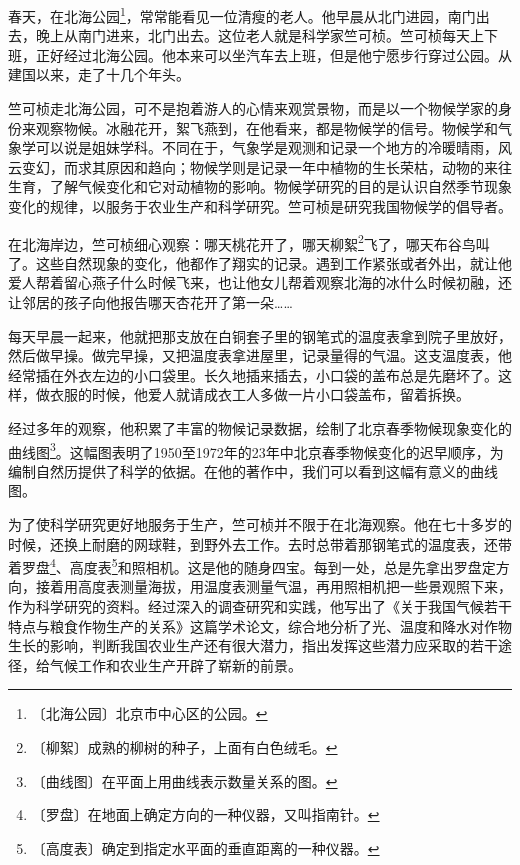 \documentclass[12pt,UTF-8,openany]{ctexbook}
\begin{document}
\begin{Large}
    
    春天，在北海公园\footnote{〔北海公园〕北京市中心区的公园。}，常常能看见一位清瘦的老人。他早晨从北门进园，南门出去，晚上从南门进来，北门出去。这位老人就是科学家竺可桢。竺可桢每天上下班，正好经过北海公园。他本来可以坐汽车去上班，但是他宁愿步行穿过公园。从建国以来，走了十几个年头。
    
    竺可桢走北海公园，可不是抱着游人的心情来观赏景物，而是以一个物候学家的身份来观察物候。冰融花开，絮飞燕到，在他看来，都是物候学的信号。物候学和气象学可以说是姐妹学科。不同在于，气象学是观测和记录一个地方的冷暖晴雨，风云变幻，而求其原因和趋向；物候学则是记录一年中植物的生长荣枯，动物的来往生育，了解气候变化和它对动植物的影响。物候学研究的目的是认识自然季节现象变化的规律，以服务于农业生产和科学研究。竺可桢是研究我国物候学的倡导者。
    
    在北海岸边，竺可桢细心观察：哪天桃花开了，哪天柳絮\footnote{〔柳絮〕成熟的柳树的种子，上面有白色绒毛。}飞了，哪天布谷鸟叫了。这些自然现象的变化，他都作了翔实的记录。遇到工作紧张或者外出，就让他爱人帮着留心燕子什么时候飞来，也让他女儿帮着观察北海的冰什么时候初融，还让邻居的孩子向他报告哪天杏花开了第一朵……
    
    每天早晨一起来，他就把那支放在白铜套子里的钢笔式的温度表拿到院子里放好，然后做早操。做完早操，又把温度表拿进屋里，记录量得的气温。这支温度表，他经常插在外衣左边的小口袋里。长久地插来插去，小口袋的盖布总是先磨坏了。这样，做衣服的时候，他爱人就请成衣工人多做一片小口袋盖布，留着拆换。
    
    经过多年的观察，他积累了丰富的物候记录数据，绘制了北京春季物候现象变化的曲线图\footnote{〔曲线图〕在平面上用曲线表示数量关系的图。}。这幅图表明了1950至1972年的23年中北京春季物候变化的迟早顺序，为编制自然历提供了科学的依据。在他的著作中，我们可以看到这幅有意义的曲线图。
    
    为了使科学研究更好地服务于生产，竺可桢并不限于在北海观察。他在七十多岁的时候，还换上耐磨的网球鞋，到野外去工作。去时总带着那钢笔式的温度表，还带着罗盘\footnote{〔罗盘〕在地面上确定方向的一种仪器，又叫指南针。}、高度表\footnote{〔高度表〕确定到指定水平面的垂直距离的一种仪器。}和照相机。这是他的随身四宝。每到一处，总是先拿出罗盘定方向，接着用高度表测量海拔，用温度表测量气温，再用照相机把一些景观照下来，作为科学研究的资料。经过深入的调查研究和实践，他写出了《关于我国气候若干特点与粮食作物生产的关系》这篇学术论文，综合地分析了光、温度和降水对作物生长的影响，判断我国农业生产还有很大潜力，指出发挥这些潜力应采取的若干途径，给气候工作和农业生产开辟了崭新的前景。
    
\end{Large}
\end{document}
